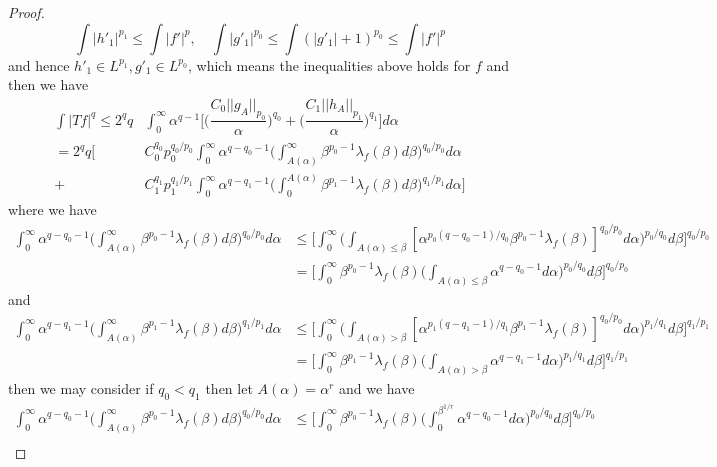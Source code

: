 \documentclass[lang=en, color=blue, ]{elegantbook}
\newcommand{\dstrb}[1]{\lambda_{#1}}
\begin{document}
\begin{proof}
    \[
        \int |h'_1|^{p_1} \leq \int |f'|^{p}, \quad \int |g'_1|^{p_0} \leq \int (|g'_1|+1)^{p_0} \leq \int |f'| ^p
    \]
    and hence $h'_1 \in L^{p_1}, g'_1 \in L^{p_0}$, which means the inequalities above holds for $f$ and then we have
    \[
    \begin{aligned}
    \int |Tf|^q \leq 2^qq &\int_0^{\infty}\alpha^{q-1}\Big[\Big(\dfrac{C_0||g_A||_{p_0}}{\alpha}\Big)^{q_0}+\Big(\dfrac{C_1||h_A||_{p_1}}{\alpha}\Big)^{q_1}\Big]d\alpha \\
    = 2^qq\Big[ &C_0^{q_0}p_0^{q_0/p_0}\int_0^{\infty}\alpha^{q-q_0-1}\Big(\int_{A(\alpha)}^{\infty}\beta^{p_0-1}\dstrb{f}(\beta)d\beta\Big)^{q_0/p_0}d\alpha\\ +&C_1^{q_1}p_1^{q_1/p_1}\int_0^{\infty}\alpha^{q-q_1-1}\Big(\int_0^{A(\alpha)}\beta^{p_1-1}\dstrb{f}(\beta)d\beta\Big)^{q_1/p_1}d\alpha\Big]
    \end{aligned}
    \]
    where we have
    \[
    \begin{aligned}
    \int_0^{\infty}\alpha^{q-q_0-1}\Big(\int_{A(\alpha)}^{\infty}\beta^{p_0-1}\dstrb{f}(\beta)d\beta\Big)^{q_0/p_0}d\alpha &\leq \Big[\int_0^{\infty}\Big(\int_{A(\alpha) \leq \beta} [\alpha^{p_0(q-q_0-1)/q_0}\beta^{p_0-1}\dstrb{f}(\beta)]^{q_0/p_0}d\alpha\Big)^{p_0/q_0}d\beta\Big]^{q_0/p_0} \\
    &=\Big[\int_0^{\infty}\beta^{p_0-1}\dstrb{f}(\beta)\Big(\int_{A(\alpha) \leq \beta} \alpha^{q-q_0-1}d\alpha\Big)^{p_0/q_0}d\beta\Big]^{q_0/p_0}
    \end{aligned}
    \]
    and
    \[
    \begin{aligned}
    \int_0^{\infty}\alpha^{q-q_1-1}\Big(\int_{A(\alpha)}^{\infty}\beta^{p_1-1}\dstrb{f}(\beta)d\beta\Big)^{q_1/p_1}d\alpha &\leq \Big[\int_0^{\infty}\Big(\int_{A(\alpha) > \beta} [\alpha^{p_1(q-q_1-1)/q_1}\beta^{p_1-1}\dstrb{f}(\beta)]^{q_0/p_0}d\alpha\Big)^{p_1/q_1}d\beta\Big]^{q_1/p_1} \\
    &=\Big[\int_0^{\infty}\beta^{p_1-1}\dstrb{f}(\beta)\Big(\int_{A(\alpha) > \beta} \alpha^{q-q_1-1}d\alpha\Big)^{p_1/q_1}d\beta\Big]^{q_1/p_1}
    \end{aligned}
    \]
    then we may consider if $q_0<q_1$ then let $A(\alpha) = \alpha^{r}$ and we have
    \[
    \begin{aligned}
    \int_0^{\infty}\alpha^{q-q_0-1}\Big(\int_{A(\alpha)}^{\infty}\beta^{p_0-1}\dstrb{f}(\beta)d\beta\Big)^{q_0/p_0}d\alpha &\leq \Big[\int_0^{\infty}\beta^{p_0-1}\dstrb{f}(\beta)\Big(\int_0^{\beta^{1/r}} \alpha^{q-q_0-1}d\alpha\Big)^{p_0/q_0}d\beta\Big]^{q_0/p_0} \\

\end{aligned}\]
\end{proof}
\end{document}
